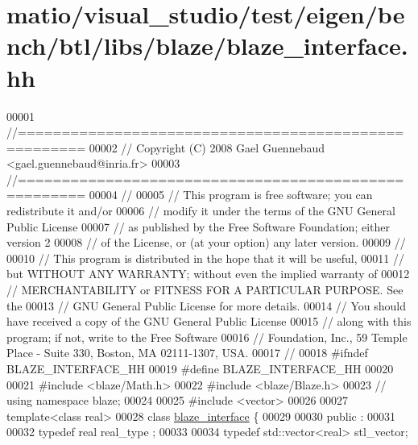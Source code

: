 \hypertarget{matio_2visual__studio_2test_2eigen_2bench_2btl_2libs_2blaze_2blaze__interface_8hh_source}{}\section{matio/visual\+\_\+studio/test/eigen/bench/btl/libs/blaze/blaze\+\_\+interface.hh}
\label{matio_2visual__studio_2test_2eigen_2bench_2btl_2libs_2blaze_2blaze__interface_8hh_source}

\begin{DoxyCode}
00001 \textcolor{comment}{//=====================================================}
00002 \textcolor{comment}{// Copyright (C) 2008 Gael Guennebaud <gael.guennebaud@inria.fr>}
00003 \textcolor{comment}{//=====================================================}
00004 \textcolor{comment}{//}
00005 \textcolor{comment}{// This program is free software; you can redistribute it and/or}
00006 \textcolor{comment}{// modify it under the terms of the GNU General Public License}
00007 \textcolor{comment}{// as published by the Free Software Foundation; either version 2}
00008 \textcolor{comment}{// of the License, or (at your option) any later version.}
00009 \textcolor{comment}{//}
00010 \textcolor{comment}{// This program is distributed in the hope that it will be useful,}
00011 \textcolor{comment}{// but WITHOUT ANY WARRANTY; without even the implied warranty of}
00012 \textcolor{comment}{// MERCHANTABILITY or FITNESS FOR A PARTICULAR PURPOSE.  See the}
00013 \textcolor{comment}{// GNU General Public License for more details.}
00014 \textcolor{comment}{// You should have received a copy of the GNU General Public License}
00015 \textcolor{comment}{// along with this program; if not, write to the Free Software}
00016 \textcolor{comment}{// Foundation, Inc., 59 Temple Place - Suite 330, Boston, MA  02111-1307, USA.}
00017 \textcolor{comment}{//}
00018 \textcolor{preprocessor}{#ifndef BLAZE\_INTERFACE\_HH}
00019 \textcolor{preprocessor}{#define BLAZE\_INTERFACE\_HH}
00020 
00021 \textcolor{preprocessor}{#include <blaze/Math.h>}
00022 \textcolor{preprocessor}{#include <blaze/Blaze.h>}
00023 \textcolor{comment}{// using namespace blaze;}
00024 
00025 \textcolor{preprocessor}{#include <vector>}
00026 
00027 \textcolor{keyword}{template}<\textcolor{keyword}{class} real>
00028 \textcolor{keyword}{class }\hyperlink{classblaze__interface}{blaze\_interface} \{
00029 
00030 public :
00031 
00032   \textcolor{keyword}{typedef} real real\_type ;
00033 
00034   \textcolor{keyword}{typedef} std::vector<real>        stl\_vector;

\end{DoxyCode}
